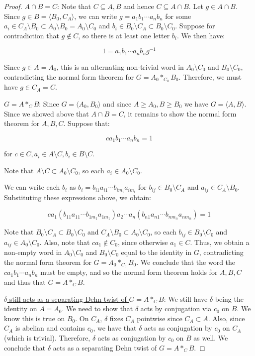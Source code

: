\documentclass[10pt,a4paper]{amsart}
\newcommand{\vs}{\vspace{10pt}}
\begin{document}
\begin{proof}
\vs 


\underline{$A \cap B = C$}: Note that $C \subseteq A,B$ and hence $C \subseteq A \cap B$. Let $g \in A \cap B$. Since $g \in B = \langle B_0, C_A \rangle$, we can write $g = a_1 b_1 \cdots a_n b_n$ for some $a_i \in C_A \setminus B_0 \subset A_0 \setminus B_0 = A_0 \setminus C_0$ and $b_i \in B_0 \setminus C_A \subset B_0 \setminus C_0$. Suppose for contradiction that $g \notin C$, so there is at least one letter $b_i$. We then have: 

$$1 = a_1 b_1 \cdots a_n b_n g^{-1}$$

Since $g \in A = A_0$, this is an alternating non-trivial word in $A_0 \setminus C_0$ and $B_0 \setminus C_0$, contradicting the normal form theorem for $G = A_0 *_{C_0} B_0$. Therefore, we must have $g \in C_A = C$. 

\vs

\underline{$G = A *_C B$}: Since $G = \langle A_0, B_0 \rangle$ and since $A \geq A_0, B \geq B_0$ we have $G = \langle A, B\rangle$. Since we showed above that $A \cap B = C$, it remains to show the normal form theorem for $A,B,C$. Suppose that: 

$$c a_1 b_1 \cdots a_n b_n = 1$$

for $c \in C, a_i \in A \setminus C, b_i \in B \setminus C$. 


Note that $A \setminus C \subset A_0 \setminus C_0$, so each $a_i \in A_0 \setminus C_0$. 

We can write each $b_i$ as $b_i = b_{i1}a_{i1} \cdots b_{im_i} a_{im_i}$ for $b_{ij} \in B_0 \setminus C_A$ and $a_{ij} \in C_A \setminus B_0$.  Substituting these expressions above, we obtain: 

$$ c a_1 (b_{11}a_{11} \cdots b_{1m_1} a_{1m_1})a_2 \cdots a_n (b_{n1}a_{n1} \cdots b_{nm_n} a_{nm_n}) = 1 $$

Note that $B_0 \setminus C_A \subset B_0 \setminus C_0$ and $C_A \setminus B_0 \subset A_0 \setminus C_0$, so each $b_{ij} \in B_0 \setminus C_0$ and $a_{ij} \in A_0 \setminus C_0$. Also, note that $ca_1 \notin C_0$, since otherwise $a_1 \in C$. Thus, we obtain a non-empty word in $A_0 \setminus C_0$ and $B_0 \setminus C_0$ equal to the identity in $G$, contradicting the normal form theorem for $G = A_0 *_{C_0} B_0$. We conclude that the word the $c a_1 b_1 \cdots a_n b_n$ must be empty, and so the normal form theorem holds for $A,B,C$ and thus that $G = A *_C B$. 

\vs 

\underline{$\delta$ still acts as a separating Dehn twist of $G = A *_C B$}: We still have $\delta$ being the identity on $A = A_0$. We need to show that $\delta$ acts by conjugation via $c_0$ on $B$. We know this is true on $B_0$. On $C_A$, $\delta$ fixes $C_A$ pointwise since $C_A \subset A$. Also, since $C_A$ is abelian and contains $c_0$, we have that $\delta$ acts as conjugation by $c_0$ on $C_A$ (which is trivial). Therefore, $\delta$ acts as conjugation by $c_0$ on $B$ as well. We conclude that $\delta$ acts as a separating Dehn twist of $G = A *_C B$. 


\end{proof}
\end{document}
